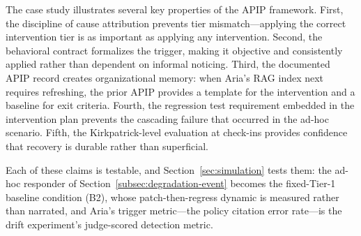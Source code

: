 The case study illustrates several key properties of the APIP framework. First,
the discipline of cause attribution prevents tier mismatch---applying the
correct intervention tier is as important as applying any intervention. Second,
the behavioral contract formalizes the trigger, making it objective and
consistently applied rather than dependent on informal noticing. Third, the
documented APIP record creates organizational memory: when Aria's RAG index
next requires refreshing, the prior APIP provides a template for the
intervention and a baseline for exit criteria. Fourth, the regression test
requirement embedded in the intervention plan prevents the cascading failure
that occurred in the ad-hoc scenario. Fifth, the Kirkpatrick-level evaluation
at check-ins provides confidence that recovery is durable rather than
superficial.

Each of these claims is testable, and Section~\ref{sec:simulation} tests them:
the ad-hoc responder of Section~\ref{subsec:degradation-event} becomes the
fixed-Tier-1 baseline condition (B2), whose patch-then-regress dynamic is
measured rather than narrated, and Aria's trigger metric---the policy citation
error rate---is the drift experiment's judge-scored detection metric.
